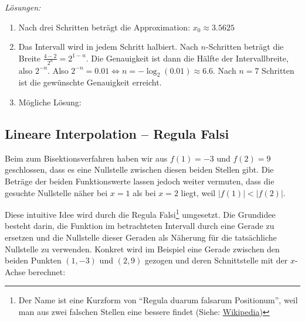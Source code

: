 \clearpage
\emph{Lösungen:}
\begin{enumerate}
	\item Nach drei Schritten beträgt die Approximation: $x_0 \approx 3.5625$
	\item Das Intervall wird in jedem Schritt halbiert. Nach $n$-Schritten beträgt die Breite $\frac{4-2}{2^n} = 2^{1-n}$. Die Genauigkeit ist dann die Hälfte der Intervallbreite, also $2^{-n}$. Also $2^{-n} = 0.01 \iff n = -\log_2(0.01) \approx 6.6$. Nach $n=7$ Schritten ist die gewünschte Genauigkeit erreicht.
	\item Mögliche Lösung:
	      
\end{enumerate}















\clearpage
\subsection{Lineare Interpolation – Regula Falsi}
Beim  zum Bisektionsverfahren haben wir aus $f(1)=-3$ und $f(2) = 9$ geschlossen, dass es eine Nullstelle zwischen diesen beiden Stellen gibt. Die Beträge der beiden Funktionswerte lassen jedoch weiter vermuten, dass die gesuchte Nullstelle näher bei $x=1$ als bei $x=2$ liegt, weil $|f(1)| < |f(2)|$.

Diese intuitive Idee wird durch die Regula Falsi\footnote{Der Name ist eine Kurzform von ``Regula duarum falsarum Positionum'', weil man aus zwei falschen Stellen eine bessere findet (Siehe: \href{https://de.wikipedia.org/wiki/Regula_falsi}{Wikipedia})} umgesetzt.
Die Grundidee besteht darin, die Funktion im betrachteten Intervall durch eine Gerade zu ersetzen und die Nullstelle dieser Geraden als Näherung für die tatsächliche Nullstelle zu verwenden.
Konkret wird im Beispiel eine Gerade zwischen den beiden Punkten $(1,-3)$ und $(2,9)$ gezogen und deren Schnittstelle mit der $x$-Achse berechnet:

